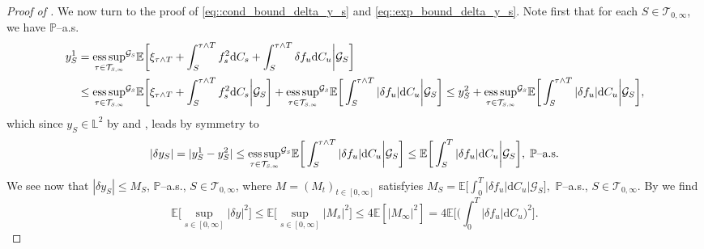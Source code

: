 \documentclass[10pt]{article} %
\newcommand\cG{\mathcal G}
\newcommand\cT{\mathcal T}
\newcommand{\smalltext}[1]{\text{\fontsize{4}{4}\selectfont$#1$}}
\def \E{\mathbb{E}}
\def \L{\mathbb{L}}
\def \P{\mathbb{P}}
\def\d{\mathrm{d}}
\DeclareMathOperator*{\esssup}{ess\,sup}
\begin{document}
\begin{proof}[Proof of ]
	\medskip
	We now turn to the proof of \eqref{eq::cond_bound_delta_y_s} and \eqref{eq::exp_bound_delta_y_s}. Note first that for each $S \in \cT_{0,\infty}$, we have $\P$--a.s.
	\begin{align*}
		y^1_S &= {\esssup_{\tau \in \cT_{\smalltext{S}\smalltext{,}\smalltext{\infty}}}}^{\cG_\smalltext{S}} \E\bigg[ \xi_{\tau \land T} + \int_S^{\tau \land T} f^2_s \d C_s + \int_S^{\tau \land T} \delta f_u \d C_u \bigg| \cG_S\bigg] \\
		&\leq {\esssup_{\tau \in \cT_{\smalltext{S}\smalltext{,}\smalltext{\infty}}}}^{\cG_\smalltext{S}} \E\bigg[ \xi_{\tau \land T} + \int_S^{\tau \land T} f^2_s \d C_s \bigg| \cG_S \bigg] + {\esssup_{\tau \in \cT_{\smalltext{S}\smalltext{,}\smalltext{\infty}}}}^{\cG_\smalltext{S}} \E\bigg[ \int_S^{\tau \land T} |\delta f_u| \d C_u \bigg| \cG_S\bigg] \leq y^2_S + {\esssup_{\tau \in \cT_{\smalltext{S}\smalltext{,}\smalltext{\infty}}}}^{\cG_\smalltext{S}} \E\bigg[ \int_S^{\tau \land T} |\delta f_u| \d C_u \bigg| \cG_S\bigg], 
	\end{align*}
	which since $y_S \in \L^2$ by  and , leads by symmetry to
	\begin{equation*}
		|\delta y_S| = |y^1_S - y^2_S| \leq {\esssup_{\tau \in \cT_{\smalltext{S}\smalltext{,}\smalltext{\infty}}}}^{\cG_\smalltext{S}} \E\bigg[ \int_S^{\tau \land T} |\delta f_u| \d C_u \bigg| \cG_S\bigg] \leq \E\bigg[ \int_S^T |\delta f_u| \d C_u \bigg| \cG_S\bigg], \; \text{$\P$--a.s.}
	\end{equation*}
	We see now that $|\delta y_S| \leq M_S$, $\P$--a.s., $S \in \cT_{0,\infty}$, where $M = (M_t)_{t \in [0,\infty]}$ satisfyies $M_S = \E\big[ \int_0^T |\delta f_u| \d C_u \big| \cG_S\big],$ $\P$--a.s.,  $S \in \cT_{0,\infty}.$ By  we find
	\begin{equation*}
		\E\bigg[\sup_{s \in [0,\infty]} |\delta y|^2\bigg] \leq \E\bigg[\sup_{s \in [0,\infty]} |M_s|^2\bigg] \leq 4  \E[|M_\infty|^2] = 4  \E\bigg[ \bigg(\int_0^T |\delta f_u| \d C_u\bigg)^2 \bigg].
	\end{equation*}
	

\end{proof}
\end{document}
